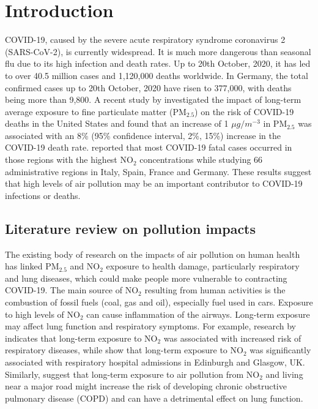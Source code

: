 \documentclass[12,]{article}
\begin{document}
\hypertarget{introduction}{%
\section{Introduction}\label{introduction}}

COVID-19, caused by the severe acute respiratory syndrome coronavirus 2
(SARS-CoV-2), is currently widespread. It is much more dangerous than
seasonal flu due to its high infection and death rates. Up to 20th
October, 2020, it has led to over 40.5 million cases and 1,120,000
deaths worldwide. In Germany, the total confirmed cases up to 20th
October, 2020 have risen to 377,000, with deaths being more than 9,800.
A recent study by \textcite{Wu2020} investigated the impact of long-term
average exposure to fine particulate matter (PM\(_{2.5}\)) on the risk
of COVID-19 deaths in the United States and found that an increase of 1
\(\mu g/m^{-3}\) in PM\(_{2.5}\) was associated with an 8\% (95\%
confidence interval, 2\%, 15\%) increase in the COVID-19 death rate.
\textcite{Ogen2020} reported that most COVID-19 fatal cases occurred in
those regions with the highest NO\(_2\) concentrations while studying 66
administrative regions in Italy, Spain, France and Germany. These
results suggest that high levels of air pollution may be an important
contributor to COVID-19 infections or deaths.

\hypertarget{literature-review-on-pollution-impacts}{%
\subsection{Literature review on pollution
impacts}\label{literature-review-on-pollution-impacts}}

The existing body of research on the impacts of air pollution on human
health has linked PM\(_{2.5}\) and NO\(_2\) exposure to health damage,
particularly respiratory and lung diseases, which could make people more
vulnerable to contracting COVID-19. The main source of NO\(_2\)
resulting from human activities is the combustion of fossil fuels (coal,
gas and oil), especially fuel used in cars. Exposure to high levels of
NO\(_2\) can cause inflammation of the airways. Long-term exposure may
affect lung function and respiratory symptoms. For example, research by
\textcite{Bowatte2017} indicates that long-term exposure to NO\(_2\) was
associated with increased risk of respiratory diseases, while
\textcite{Lee2009} show that long-term exposure to NO\(_{2}\) was
significantly associated with respiratory hospital admissions in
Edinburgh and Glasgow, UK. Similarly, \textcite{Schikowski2005} suggest
that long-term exposure to air pollution from NO\(_2\) and living near a
major road might increase the risk of developing chronic obstructive
pulmonary disease (COPD) and can have a detrimental effect on lung
function.
\end{document}
